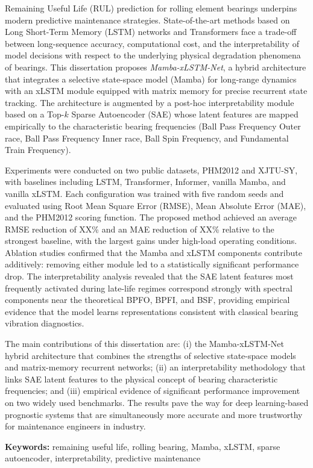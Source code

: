 
\begin{abstract*}

Remaining Useful Life (RUL) prediction for rolling element bearings
underpins modern predictive maintenance strategies. State-of-the-art
methods based on Long Short-Term Memory (LSTM) networks and
Transformers face a trade-off between long-sequence accuracy,
computational cost, and the interpretability of model decisions with
respect to the underlying physical degradation phenomena of bearings.
This dissertation proposes \emph{Mamba-xLSTM-Net}, a hybrid
architecture that integrates a selective state-space model (Mamba) for
long-range dynamics with an xLSTM module equipped with matrix memory
for precise recurrent state tracking. The architecture is augmented by
a post-hoc interpretability module based on a Top-$k$ Sparse
Autoencoder (SAE) whose latent features are mapped empirically to the
characteristic bearing frequencies (Ball Pass Frequency Outer race,
Ball Pass Frequency Inner race, Ball Spin Frequency, and Fundamental
Train Frequency).

Experiments were conducted on two public datasets, PHM2012 and
XJTU-SY, with baselines including LSTM, Transformer, Informer, vanilla
Mamba, and vanilla xLSTM. Each configuration was trained with five
random seeds and evaluated using Root Mean Square Error (RMSE), Mean
Absolute Error (MAE), and the PHM2012 scoring function. The proposed
method achieved an average RMSE reduction of XX\% and an MAE reduction
of XX\% relative to the strongest baseline, with the largest gains
under high-load operating conditions. Ablation studies confirmed that
the Mamba and xLSTM components contribute additively: removing either
module led to a statistically significant performance drop. The
interpretability analysis revealed that the SAE latent features most
frequently activated during late-life regimes correspond strongly with
spectral components near the theoretical BPFO, BPFI, and BSF,
providing empirical evidence that the model learns representations
consistent with classical bearing vibration diagnostics.

The main contributions of this dissertation are: (i) the
Mamba-xLSTM-Net hybrid architecture that combines the strengths of
selective state-space models and matrix-memory recurrent networks;
(ii) an interpretability methodology that links SAE latent features to
the physical concept of bearing characteristic frequencies; and (iii)
empirical evidence of significant performance improvement on two
widely used benchmarks. The results pave the way for deep
learning-based prognostic systems that are simultaneously more
accurate and more trustworthy for maintenance engineers in industry.

\vspace{0.5cm}
\noindent
\textbf{Keywords:} remaining useful life, rolling bearing, Mamba,
xLSTM, sparse autoencoder, interpretability, predictive maintenance

\end{abstract*}

